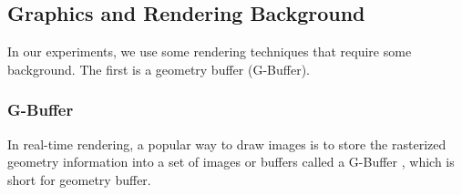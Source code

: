 \documentclass[10pt,twocolumn,letterpaper]{article}
\begin{document}
\subsection{Graphics and Rendering Background}

In our experiments, we use some rendering techniques that require some background.  The first is a geometry buffer (G-Buffer).
\subsubsection{G-Buffer}

In real-time rendering, a popular way to draw images is to store the rasterized geometry information into a set of images or buffers called a G-Buffer \cite{Saito:1990:CRS:97879.97901}, which is short for geometry buffer. 
\end{document}
